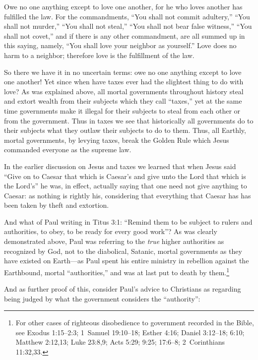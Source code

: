 \documentclass[letterpaper,12pt]{article}
\newenvironment{squote}
  {\small\quote}
  {\endquote\normalsize}
\begin{document}
\begin{squote}
Owe no one anything except to love one another, for he who loves another has fulfilled the law. For the commandments, ``You shall not commit adultery,'' ``You shall not murder,'' ``You shall not steal,'' ``You shall not bear false witness,'' ``You shall not covet,'' and if there is any other commandment, are all summed up in this saying, namely, ``You shall love your neighbor as yourself.'' Love does no harm to a neighbor; therefore love is the fulfillment of the law.
\end{squote}

So there we have it in no uncertain terms: owe no one anything except to love one another! Yet since when have taxes ever had the slightest thing to do with love? As was explained above, all mortal governments throughout history steal and extort wealth from their subjects which they call ``taxes,'' yet at the same time governments make it illegal for their subjects to steal from each other or from the government. Thus in taxes we see that historically all governments do to their subjects what they outlaw their subjects to do to them. Thus, all Earthly, mortal governments, by levying taxes, break the Golden Rule which Jesus commanded everyone as the supreme law.

In the earlier discussion on Jesus and taxes we learned that when Jesus said ``Give on to Caesar that which is Caesar's and give unto the Lord that which is the Lord's'' he was, in effect, actually saying that one need not give anything to Caesar: as nothing is rightly his, considering that everything that Caesar has has been taken by theft and extortion.

And what of Paul writing in Titus 3:1: ``Remind them to be subject to rulers and authorities, to obey, to be ready for every good work''? As was clearly demonstrated above, Paul was referring to the \emph{true} higher authorities as recognized by God, not to the diabolical, Satanic, mortal governments as they have existed on Earth---as Paul spent his entire ministry in rebellion against the Earthbound, mortal ``authorities,'' and was at last put to death by them.\footnote{For other cases of righteous disobedience to government recorded in the Bible, see Exodus 1:15--2:3; 1~Samuel 19:10--18; Esther 4:16; Daniel 3:12--18; 6:10; Matthew 2:12,13; Luke 23:8,9; Acts 5:29; 9:25; 17:6--8; 2~Corinthians 11:32,33.}

And as further proof of this, consider Paul's advice to Christians as regarding being judged by what the government considers the ``authority'':
\end{document}
